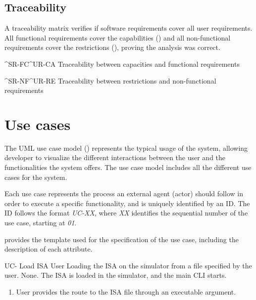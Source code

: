 \FloatBarrier


\subsection{Traceability}\label{subsec:req-traceability}
A traceability matrix verifies if software requirements cover all user requirements. All functional requirements cover the capabilities () and all non-functional requirements cover the restrictions (), proving the analysis was correct.

  {^SR-FC}{^UR-CA}
  {Traceability between capacities and functional requirements}

  {^SR-NF}{^UR-RE}
  {Traceability between restrictions and non-functional requirements}


\FloatBarrier


\section{Use cases}\label{sec:use-cases}
The UML use case model \parencite{Cook2017} () represents the typical usage of the system, allowing developer to visualize the different interactions between the user and the functionalities the system offers. The use case model includes all the different use cases for the system.


Each use case represents the process an external agent (actor) should follow in order to execute a specific functionality, and is uniquely identified by an ID. The ID follows the format \textit{UC-XX}, where \textit{XX} identifies the sequential number of the use case, starting at \textit{01}.

 provides the template used for the specification of the use case, including the description of each attribute.



\setcounter{i}{1}

\begin{useCase}{UC-}
  {Load \gls{ISA}}  %
  {User}  %
  {Loading the \gls{ISA} on the simulator from a file specified by the user.}  %
  {None.}  %
  {The \gls{ISA} is loaded in the simulator, and the main \gls{CLI} starts.}  %
  \begin{enumerate}[leftmargin=*, topsep=0pt, noitemsep]  %
    \item User provides the route to the \gls{ISA} file through an executable argument.
  \end{enumerate}
\end{useCase}

